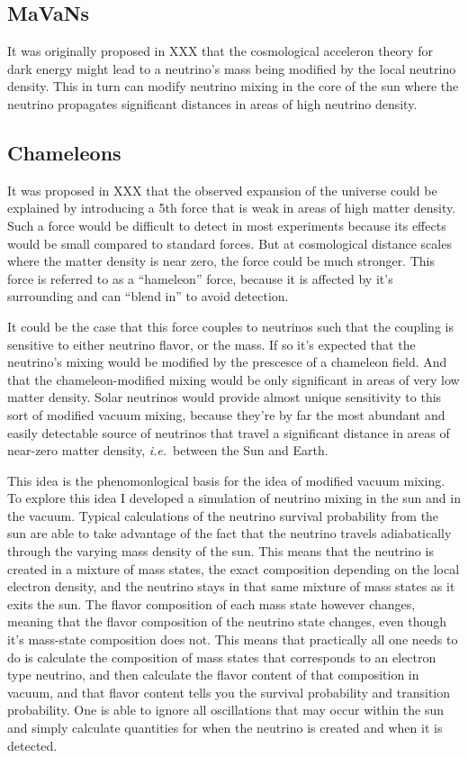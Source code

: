 \subsection{MaVaNs}
It was originally proposed in XXX that the cosmological acceleron theory for dark
energy might lead to a neutrino's mass being modified by the local neutrino density.
This in turn can modify neutrino mixing in the core of the sun where the neutrino
propagates significant distances in areas of high neutrino density.

\subsection{Chameleons}
It was proposed in XXX that the observed expansion
of the universe could be explained by introducing a 5th force that is weak
in areas of high matter density. Such a force would be difficult to detect
in most experiments because its effects would be small compared to standard
forces. But at cosmological distance scales where the matter density is near
zero, the force could be much stronger. This force is referred to as a ``hameleon''
force, because it is affected by it's surrounding and can ``blend in'' to avoid
detection.

It could be the case that this force couples to neutrinos such that the coupling
is sensitive to either neutrino flavor, or the mass. If so it's expected that the
neutrino's mixing would be modified by the prescesce of a chameleon field.
And that the chameleon-modified mixing would be only significant in areas of very
low matter density.
Solar neutrinos would provide almost unique sensitivity to this sort of modified
vacuum mixing, because they're by far the most abundant and easily detectable source
of neutrinos that travel a significant distance in areas of near-zero matter
density, \textit{ i.e.}\ between the Sun and Earth.

This idea is the phenomonlogical basis for the idea of modified vacuum mixing.
To explore this idea I developed a simulation of neutrino mixing in the sun and in
the vacuum. Typical calculations of the neutrino survival probability from
the sun are able to take advantage of the fact that the neutrino travels adiabatically
through the varying mass density of the sun. This means that the neutrino is
created in a mixture of mass states, the exact composition depending on the local
electron density, and the neutrino stays in that same mixture of mass states
as it exits the sun. The flavor composition of each mass state however changes,
meaning that the flavor composition of the neutrino state changes, even though
it's mass-state composition does not.
This means that practically all one needs to do is calculate the composition
of mass states that corresponds to an electron type neutrino, and then calculate
the flavor content of that composition in vacuum, and that flavor content
tells you the survival probability and transition probability. One is able to
ignore all oscillations that may occur within the sun and simply calculate
quantities for when the neutrino is created and when it is detected.


